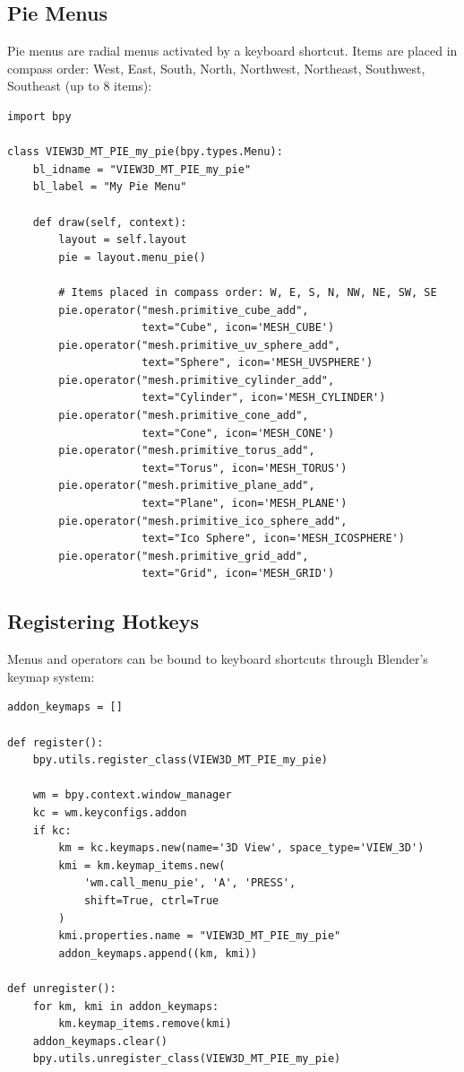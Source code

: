 \subsection{Pie Menus}

Pie menus are radial menus activated by a keyboard shortcut. Items are placed in compass order: West, East, South, North, Northwest, Northeast, Southwest, Southeast (up to 8 items):

\begin{lstlisting}
import bpy

class VIEW3D_MT_PIE_my_pie(bpy.types.Menu):
    bl_idname = "VIEW3D_MT_PIE_my_pie"
    bl_label = "My Pie Menu"

    def draw(self, context):
        layout = self.layout
        pie = layout.menu_pie()

        # Items placed in compass order: W, E, S, N, NW, NE, SW, SE
        pie.operator("mesh.primitive_cube_add",
                     text="Cube", icon='MESH_CUBE')
        pie.operator("mesh.primitive_uv_sphere_add",
                     text="Sphere", icon='MESH_UVSPHERE')
        pie.operator("mesh.primitive_cylinder_add",
                     text="Cylinder", icon='MESH_CYLINDER')
        pie.operator("mesh.primitive_cone_add",
                     text="Cone", icon='MESH_CONE')
        pie.operator("mesh.primitive_torus_add",
                     text="Torus", icon='MESH_TORUS')
        pie.operator("mesh.primitive_plane_add",
                     text="Plane", icon='MESH_PLANE')
        pie.operator("mesh.primitive_ico_sphere_add",
                     text="Ico Sphere", icon='MESH_ICOSPHERE')
        pie.operator("mesh.primitive_grid_add",
                     text="Grid", icon='MESH_GRID')
\end{lstlisting}

\subsection{Registering Hotkeys}

Menus and operators can be bound to keyboard shortcuts through Blender's keymap system:

\begin{lstlisting}
addon_keymaps = []

def register():
    bpy.utils.register_class(VIEW3D_MT_PIE_my_pie)

    wm = bpy.context.window_manager
    kc = wm.keyconfigs.addon
    if kc:
        km = kc.keymaps.new(name='3D View', space_type='VIEW_3D')
        kmi = km.keymap_items.new(
            'wm.call_menu_pie', 'A', 'PRESS',
            shift=True, ctrl=True
        )
        kmi.properties.name = "VIEW3D_MT_PIE_my_pie"
        addon_keymaps.append((km, kmi))

def unregister():
    for km, kmi in addon_keymaps:
        km.keymap_items.remove(kmi)
    addon_keymaps.clear()
    bpy.utils.unregister_class(VIEW3D_MT_PIE_my_pie)
\end{lstlisting}


